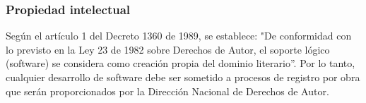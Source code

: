 {\begin{enumerate}
\end{enumerate}

\subsubsection*{Propiedad intelectual}

Según el artículo 1 del Decreto 1360 de 1989, se establece: "De conformidad con lo previsto en la Ley 23 de 1982 sobre Derechos de Autor, el soporte lógico (software) se considera como creación propia del dominio literario”. Por lo tanto, cualquier desarrollo de software debe ser sometido a procesos de registro por obra que serán proporcionados por la Dirección Nacional de Derechos de Autor. 
}